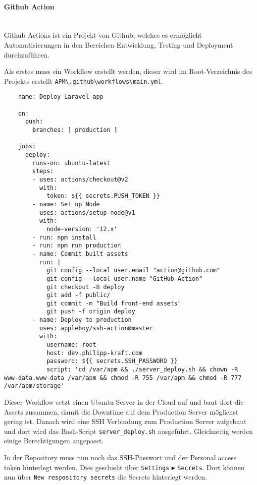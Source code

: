 \paragraph{Github Action}\mbox{}\\
Github Actions ist ein Projekt von Github, welches es ermöglicht
Automatisierungen in den Bereichen Entwicklung, Testing und Deployment
durchzuführen.

Als erstes muss ein Workflow erstellt werden, dieser wird im Root-Verzeichnis
des Projekts erstellt \verb|APM\.github\workflows\main.yml|.

\begin{longlisting}
  \begin{verbatim}
    name: Deploy Laravel app

    on:
      push:
        branches: [ production ]
    
    jobs:
      deploy:
        runs-on: ubuntu-latest
        steps:
        - uses: actions/checkout@v2
          with:
            token: ${{ secrets.PUSH_TOKEN }}
        - name: Set up Node
          uses: actions/setup-node@v1
          with:
            node-version: '12.x'
        - run: npm install
        - run: npm run production
        - name: Commit built assets
          run: |
            git config --local user.email "action@github.com"
            git config --local user.name "GitHub Action"
            git checkout -B deploy
            git add -f public/
            git commit -m "Build front-end assets"
            git push -f origin deploy
        - name: Deploy to production
          uses: appleboy/ssh-action@master
          with:
            username: root
            host: dev.philipp-kraft.com
            password: ${{ secrets.SSH_PASSWORD }}
            script: 'cd /var/apm && ./server_deploy.sh && chown -R www-data.www-data /var/apm && chmod -R 755 /var/apm && chmod -R 777 /var/apm/storage' 
  \end{verbatim}
  \caption{main.yml}
\end{longlisting}

Dieser Workflow setzt einen Ubuntu Server in der Cloud auf und baut dort die
Assets zusammen, damit die Downtime auf dem Production Server möglichst gering
ist. Danach wird eine SSH Verbindung zum Production Server aufgebaut und dort
wird das Bash-Script \verb|server_deploy.sh| ausgeführt. Gleichzeitig werden
einige Berechtigungen angepasst.

In der Repository muss nun noch das SSH-Passwort und der Personal access token
hinterlegt werden. Dies geschieht über \verb|Settings| $\blacktriangleright$
\verb|Secrets|. Dort können nun über \verb|New respository secrets| die Secrets
hinterlegt werden.

